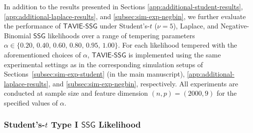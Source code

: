 \documentclass[12pt]{article}
\numberwithin{equation}{section}
\newcommand{\ssg}{\mathsf{SSG}}
\newcommand{\tssg}{\mathsf{TAVIE}\text{-}\mathsf{SSG}}
\begin{document}
In addition to the results presented in Sections \ref{app:additional-student-results}, \ref{app:additional-laplace-results}, and \ref{subsec:sim-exp-negbin}, we further evaluate the performance of $\tssg$ under Student's-$t$ ($\nu=5$), Laplace, and Negative-Binomial $\ssg$ likelihoods over a range of tempering parameters $\alpha \in \{0.20,\, 0.40,\, 0.60,\, 0.80,\, 0.95,\, 1.00\}$. For each likelihood tempered with the aforementioned choices of $\alpha$, $\tssg$ is implemented using the same experimental settings as in the corresponding simulation setups of Sections~\ref{subsec:sim-exp-student} (in the main manuscript), \ref{app:additional-laplace-results}, and \ref{subsec:sim-exp-negbin}, respectively. All experiments are conducted at sample size and feature dimension $(n, p) = (2000, 9)$ for the specified values of $\alpha$.


\subsubsection{\texorpdfstring{Student's-$t$}{Student's-t} Type I \texorpdfstring{$\ssg$}{SSG} Likelihood}
\end{document}
